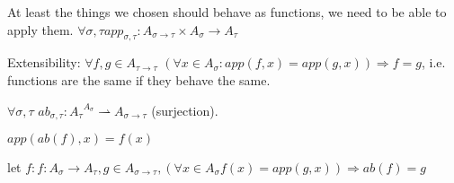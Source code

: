 \documentclass[a4paper,10pt]{book}
\begin{document}
At least the things we chosen should behave as functions, we need to be able to apply them.
$\forall \sigma, \tau app_{\sigma,\tau} : A_{\sigma \rightarrow \tau} \times A_{\sigma} 
\rightarrow A_{\tau}$

Extensibility: $\forall f,g \in A_{\tau \rightarrow \tau}$ $(\forall x \in A_{\sigma}: app(f,x) = app(g,x)) \Rightarrow f = g$, i.e. functions are the same if they behave the same.

$\forall \sigma,\tau$  $ab_{\sigma,\tau}: {A_\tau}^{A_\sigma} \rightharpoonup A_{\sigma \rightarrow \tau}$ (surjection).

$app (ab(f), x) = f(x)$

let $f: f: A_{\sigma} \rightarrow A_{\tau}, g \in A_{\sigma \rightarrow \tau}, 
(\forall x \in A_{\sigma} f(x) = app(g,x)) \Rightarrow ab(f) = g$
\end{document}
